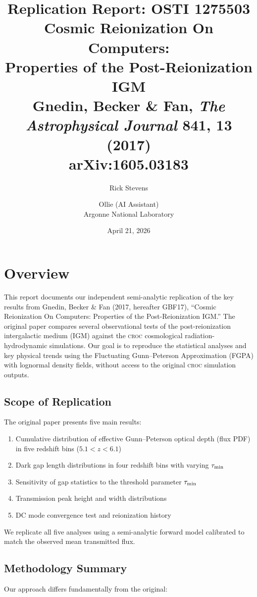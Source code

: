 \documentclass[11pt]{article}
\title{\textbf{Replication Report: OSTI 1275503}\\[0.3em]
\large Cosmic Reionization On Computers:\\
Properties of the Post-Reionization IGM\\[0.3em]
\normalsize Gnedin, Becker \& Fan, \textit{The Astrophysical Journal} 841, 13 (2017)\\
\normalsize arXiv:1605.03183}
\author{Rick Stevens \and Ollie (AI Assistant)\\
Argonne National Laboratory}
\date{April 21, 2026}
\newcommand{\taumin}{\tau_{\rm min}}
\newcommand{\croc}{\textsc{croc}}
\begin{document}
\maketitle
\thispagestyle{fancy}

\section{Overview}

This report documents our independent semi-analytic replication of the key results from Gnedin, Becker \& Fan (2017, hereafter GBF17), ``Cosmic Reionization On Computers: Properties of the Post-Reionization IGM.'' The original paper compares several observational tests of the post-reionization intergalactic medium (IGM) against the \croc{} cosmological radiation-hydrodynamic simulations. Our goal is to reproduce the statistical analyses and key physical trends using the Fluctuating Gunn--Peterson Approximation (FGPA) with lognormal density fields, without access to the original \croc{} simulation outputs.

\subsection{Scope of Replication}

The original paper presents five main results:
\begin{enumerate}[leftmargin=*]
    \item Cumulative distribution of effective Gunn--Peterson optical depth (flux PDF) in five redshift bins ($5.1 < z < 6.1$)
    \item Dark gap length distributions in four redshift bins with varying $\taumin$
    \item Sensitivity of gap statistics to the threshold parameter $\taumin$
    \item Transmission peak height and width distributions
    \item DC mode convergence test and reionization history
\end{enumerate}
We replicate all five analyses using a semi-analytic forward model calibrated to match the observed mean transmitted flux.

\subsection{Methodology Summary}

Our approach differs fundamentally from the original:
\end{document}
